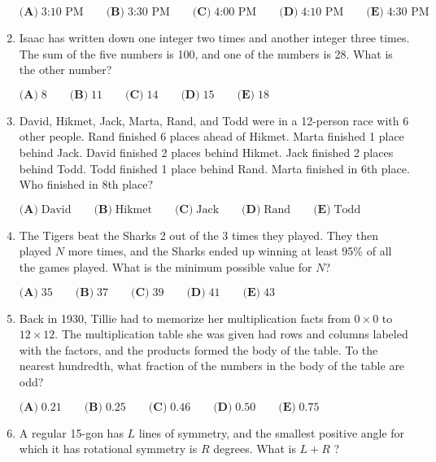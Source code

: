 \documentclass{article}
\begin{document}
\begin{enumerate}[label=\arabic*., itemsep=0.5em]
$\textbf{(A)}\; \text{3:10 PM} \qquad\textbf{(B)}\; \text{3:30 PM} \qquad\textbf{(C)}\; \text{4:00 PM} \qquad\textbf{(D)}\; \text{4:10 PM} \qquad\textbf{(E)}\; \text{4:30 PM}$\par \vspace{0.5em}\item Isaac has written down one integer two times and another integer three times. The sum of the five numbers is 100, and one of the numbers is 28. What is the other number?

$\textbf{(A)}\; 8 \qquad\textbf{(B)}\; 11 \qquad\textbf{(C)}\; 14 \qquad\textbf{(D)}\; 15 \qquad\textbf{(E)}\; 18$\par \vspace{0.5em}\item David, Hikmet, Jack, Marta, Rand, and Todd were in a 12-person race with 6 other people. Rand finished 6 places ahead of Hikmet. Marta finished 1 place behind Jack. David finished 2 places behind Hikmet. Jack finished 2 places behind Todd. Todd finished 1 place behind Rand. Marta finished in 6th place. Who finished in 8th place?

$\textbf{(A)}\; \text{David} \qquad\textbf{(B)}\; \text{Hikmet} \qquad\textbf{(C)}\; \text{Jack} \qquad\textbf{(D)}\; \text{Rand} \qquad\textbf{(E)}\; \text{Todd}$\par \vspace{0.5em}\item The Tigers beat the Sharks 2 out of the 3 times they played. They then played $N$ more times, and the Sharks ended up winning at least 95\% of all the games played. What is the minimum possible value for $N$?

$\textbf{(A)}\; 35 \qquad  \textbf{(B)}\; 37 \qquad \textbf{(C)}\; 39 \qquad \textbf{(D)}\; 41 \qquad \textbf{(E)}\; 43$\par \vspace{0.5em}\item Back in 1930, Tillie had to memorize her multiplication facts from $0 \times 0$ to $12 \times 12$. The multiplication table she was given had rows and columns labeled with the factors, and the products formed the body of the table. To the nearest hundredth, what fraction of the numbers in the body of the table are odd?

$\textbf{(A)}\; 0.21 \qquad\textbf{(B)}\; 0.25 \qquad\textbf{(C)}\; 0.46 \qquad\textbf{(D)}\; 0.50 \qquad\textbf{(E)}\; 0.75$\par \vspace{0.5em}\item A regular 15-gon has $L$ lines of symmetry, and the smallest positive angle for which it has rotational symmetry is $R$ degrees. What is $L+R$ ?


\end{enumerate}
\end{document}
